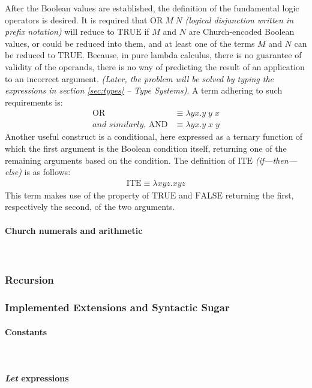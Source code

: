 \documentclass[a4paper,10pt]{article}
\begin{document}
After the Boolean values are established, the definition of the fundamental
logic operators is desired. It is required that $\mathrm{OR}\;M\;N$ 
\textit{(logical disjunction written in prefix notation)} will
reduce to $\mathrm{TRUE}$ if $M$ and $N$ are Church-encoded Boolean values,
or could be reduced into them,
and at least one of the terms $M$ and $N$ can be reduced to $\mathrm{TRUE}$.
Because, in pure lambda calculus, there is no guarantee of validity of
the operands, there is no way of predicting the result of an application to
an incorrect argument. \textit{(Later, the problem will be solved by typing
the expressions in section \ref{sec:types} -- Type Systems)}. A term adhering to
such requirements is:
\begin{align*}
	\mathrm{OR} &\equiv \lambda y x. y\;y\;x\\
	\textit{and similarly, }\mathrm{AND} &\equiv \lambda y x. y\;x\;y
\end{align*}
Another useful construct is a conditional, here expressed as a ternary function
of which the first argument is the Boolean condition itself, returning one
of the remaining arguments based on the condition. The definition of
$\mathrm{ITE}$ \textit{(if---then---else)} is as follows:
\begin{align*}
	\mathrm{ITE} \equiv \lambda xyz.xyz
\end{align*}
This term makes use of the property of $\mathrm{TRUE}$ and $\mathrm{FALSE}$
returning the first, respectively the second, of the two arguments.

\paragraph{Church numerals and arithmetic}~\\ \label{encoding}
\subsubsection{Recursion}
\subsubsection{Implemented Extensions and Syntactic Sugar}
\paragraph{Constants}~\\
\paragraph{\textit{Let} expressions}~\\
\end{document}
